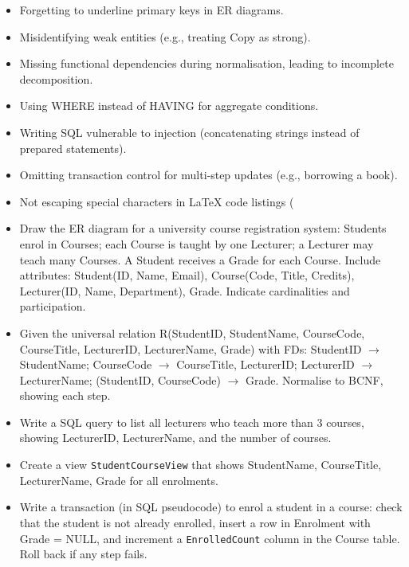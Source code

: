\documentclass[11pt]{article}
\begin{document}
\begin{attention}
\begin{itemize}
\item Forgetting to underline primary keys in ER diagrams.
\item Misidentifying weak entities (e.g., treating Copy as strong).
\item Missing functional dependencies during normalisation, leading to incomplete decomposition.
\item Using WHERE instead of HAVING for aggregate conditions.
\item Writing SQL vulnerable to injection (concatenating strings instead of prepared statements).
\item Omitting transaction control for multi‑step updates (e.g., borrowing a book).
\item Not escaping special characters in LaTeX code listings (%
\end{itemize}
\end{attention}

\begin{exercice}
\begin{itemize}
\item Draw the ER diagram for a university course registration system: Students enrol in Courses; each Course is taught by one Lecturer; a Lecturer may teach many Courses. A Student receives a Grade for each Course. Include attributes: Student(ID, Name, Email), Course(Code, Title, Credits), Lecturer(ID, Name, Department), Grade. Indicate cardinalities and participation.
\item Given the universal relation R(StudentID, StudentName, CourseCode, CourseTitle, LecturerID, LecturerName, Grade) with FDs: StudentID $\rightarrow$ StudentName; CourseCode $\rightarrow$ CourseTitle, LecturerID; LecturerID $\rightarrow$ LecturerName; (StudentID, CourseCode) $\rightarrow$ Grade. Normalise to BCNF, showing each step.
\item Write a SQL query to list all lecturers who teach more than 3 courses, showing LecturerID, LecturerName, and the number of courses.
\item Create a view \texttt{StudentCourseView} that shows StudentName, CourseTitle, LecturerName, Grade for all enrolments.
\item Write a transaction (in SQL pseudocode) to enrol a student in a course: check that the student is not already enrolled, insert a row in Enrolment with Grade = NULL, and increment a \texttt{EnrolledCount} column in the Course table. Roll back if any step fails.
\end{itemize}
\end{exercice}
\end{document}
